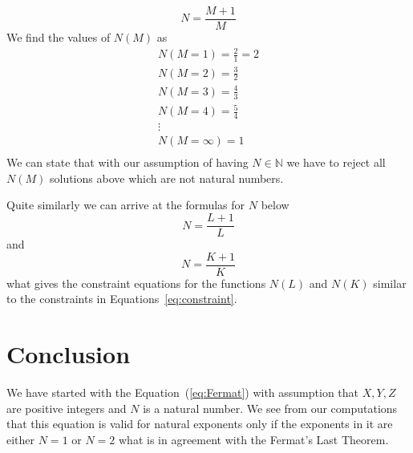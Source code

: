 \documentclass[SecEq,CM,GP]{degruyter-crelle} %
\theoremstyle{plain}
\theoremstyle{definition}
\begin{document}
\begin{equation}
\label{eq:constraintNM}
N = \frac{M+1}{M}
\end{equation}
We find the values of $N(M)$ as
\begin{eqnarray}
\label{eq:constraint}
N(M=1) = \frac{2}{1} = 2    \\ \nonumber
N(M=2) = \frac{3}{2}        \\ \nonumber
N(M=3) = \frac{4}{3}        \\ \nonumber
N(M=4) = \frac{5}{4}        \\ \nonumber
\vdots                      \\ \nonumber
N(M=\infty) = 1             \\ \nonumber
\end{eqnarray}
We can state that with our assumption of having $N \in \mathbb{N}$ we have to reject
all $N(M)$ solutions above which are not natural numbers.

Quite similarly we can arrive at the formulas for $N$ below
\begin{equation}
  \label{eq:constraintNL}
  N = \frac{L+1}{L}
\end{equation}
and
\begin{equation}
   \label{eq:constraintNK}
  N = \frac{K+1}{K}
\end{equation}
what gives the constraint equations for the functions $N(L)$ and $N(K)$ similar to the constraints in Equations~\ref{eq:constraint}\@.



\section{Conclusion}\label{sec:conclusion}

We have started with the Equation~(\ref{eq:Fermat}) with assumption that $X, Y, Z$ are positive 
integers and $N$ is a natural number.
We see from our computations
that this equation is valid for natural exponents only if the exponents in it are either 
$N=1$ or $N=2$ what is in agreement with the Fermat's Last Theorem.




\end{document}
